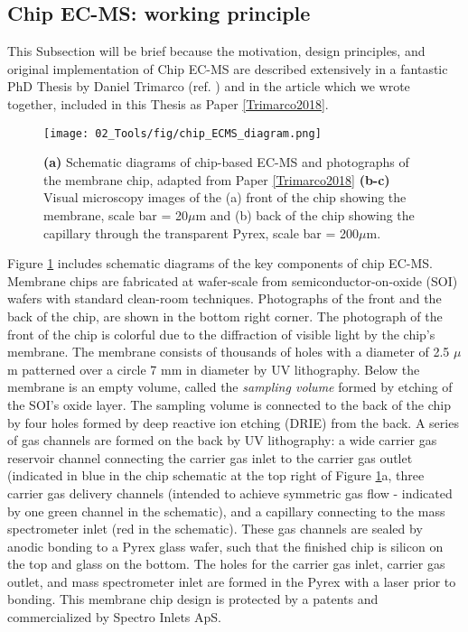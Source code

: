 \subsection{Chip EC-MS: working principle}\label{subsec:ECMS}

This Subsection will be brief because the motivation, design principles, and original implementation of Chip EC-MS are described extensively in a fantastic PhD Thesis by Daniel Trimarco (ref. \cite{Trimarco2017_PhD}) and in the article which we wrote together, included in this Thesis as Paper \ref{Trimarco2018}. 


\begin{figure}[h!]
	\centering
	\texttt{[image: 02\_Tools/fig/chip\_ECMS\_diagram.png]}
	\caption{\textbf{(a)} Schematic diagrams of chip-based EC-MS and photographs of the membrane chip, adapted from Paper \ref{Trimarco2018} \textbf{(b-c)} Visual microscopy images of the (a) front of the chip showing the membrane, scale bar = 20$\mu$m and (b) back of the chip showing the capillary through the transparent Pyrex, scale bar = 200$\mu$m.}
	\label{fig:chipECMS}
\end{figure}

Figure \ref{fig:chipECMS} includes schematic diagrams of the key components of chip EC-MS. Membrane chips are fabricated at wafer-scale from semiconductor-on-oxide (SOI) wafers with standard clean-room techniques. Photographs of the front and the back of the chip, are shown in the bottom right corner. The photograph of the front of the chip is colorful due to the diffraction of visible light by the chip's membrane. The membrane consists of thousands of holes with a diameter of 2.5 $\mu$m patterned over a circle 7 mm in diameter by UV lithography. Below the membrane is an empty volume, called the \textit{sampling volume} formed by etching of the SOI's oxide layer. The sampling volume is connected to the back of the chip by four holes formed by deep reactive ion etching (DRIE) from the back. A series of gas channels are formed on the back by UV lithography: a wide carrier gas reservoir channel connecting the carrier gas inlet to the carrier gas outlet (indicated in blue in the chip schematic at the top right of Figure \ref{fig:chipECMS}a, three carrier gas delivery channels (intended to achieve symmetric gas flow - indicated by one green channel in the schematic), and a capillary connecting to the mass spectrometer inlet (red in the schematic). These gas channels are sealed by anodic bonding to a Pyrex glass wafer, such that the finished chip is silicon on the top and glass on the bottom. The holes for the carrier gas inlet, carrier gas outlet, and mass spectrometer inlet are formed in the Pyrex with a  laser prior to bonding. This membrane chip design is protected by a patents\cite{Trimarco_Patent} and commercialized by Spectro Inlets ApS.

